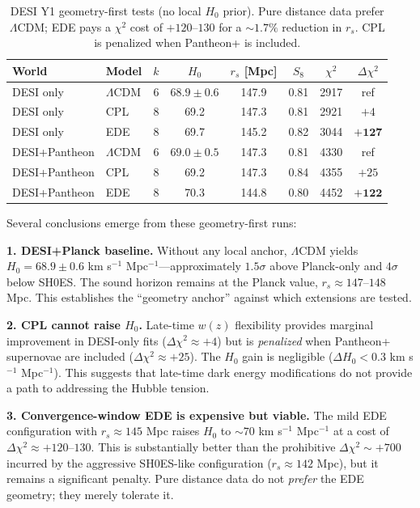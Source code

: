 \documentclass[a4paper,11pt]{article}
\begin{document}
\begin{table}[ht]
\centering
\caption{DESI Y1 geometry-first tests (no local $H_0$ prior). Pure distance data prefer $\Lambda$CDM; EDE pays a $\chi^2$ cost of $+120$--$130$ for a $\sim 1.7\%$ reduction in $r_s$. CPL is penalized when Pantheon+ is included.}
\label{tab:desi_geometry}
\begin{tabular}{llcccccc}
\hline
World & Model & $k$ & $H_0$ & $r_s$ [Mpc] & $S_8$ & $\chi^2$ & $\Delta\chi^2$ \\
\hline
DESI only & $\Lambda$CDM & 6 & $68.9 \pm 0.6$ & 147.9 & 0.81 & 2917 & ref \\
DESI only & CPL & 8 & 69.2 & 147.3 & 0.81 & 2921 & $+4$ \\
DESI only & EDE & 8 & 69.7 & 145.2 & 0.82 & 3044 & $\mathbf{+127}$ \\
\hline
DESI+Pantheon & $\Lambda$CDM & 6 & $69.0 \pm 0.5$ & 147.3 & 0.81 & 4330 & ref \\
DESI+Pantheon & CPL & 8 & 69.2 & 147.3 & 0.84 & 4355 & $+25$ \\
DESI+Pantheon & EDE & 8 & 70.3 & 144.8 & 0.80 & 4452 & $\mathbf{+122}$ \\
\hline
\end{tabular}
\end{table}

Several conclusions emerge from these geometry-first runs:

\textbf{1. DESI+Planck baseline.} Without any local anchor, $\Lambda$CDM yields $H_0 = 68.9 \pm 0.6$ km s$^{-1}$ Mpc$^{-1}$---approximately $1.5\sigma$ above Planck-only and $4\sigma$ below SH0ES. The sound horizon remains at the Planck value, $r_s \approx 147$--$148$ Mpc. This establishes the ``geometry anchor'' against which extensions are tested.

\textbf{2. CPL cannot raise $H_0$.} Late-time $w(z)$ flexibility provides marginal improvement in DESI-only fits ($\Delta\chi^2 \approx +4$) but is \emph{penalized} when Pantheon+ supernovae are included ($\Delta\chi^2 \approx +25$). The $H_0$ gain is negligible ($\Delta H_0 < 0.3$ km s$^{-1}$ Mpc$^{-1}$). This suggests that late-time dark energy modifications do not provide a path to addressing the Hubble tension.

\textbf{3. Convergence-window EDE is expensive but viable.} The mild EDE configuration with $r_s \approx 145$ Mpc raises $H_0$ to $\sim 70$ km s$^{-1}$ Mpc$^{-1}$ at a cost of $\Delta\chi^2 \approx +120$--$130$. This is substantially better than the prohibitive $\Delta\chi^2 \sim +700$ incurred by the aggressive SH0ES-like configuration ($r_s \approx 142$ Mpc), but it remains a significant penalty. Pure distance data do not \emph{prefer} the EDE geometry; they merely tolerate it.
\end{document}
